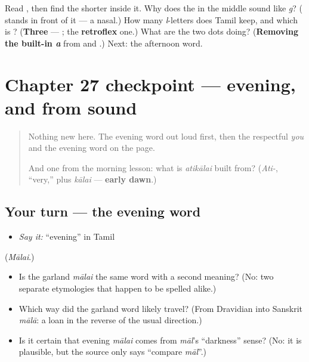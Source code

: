\begin{tcolorbox}[breakable,colback=teal!4,colframe=teal!35!black,title={Before you move on}]
Read \textbf{}, then find the shorter \textbf{} inside it. Why does the \textbf{} in the middle sound like \emph{g}? (\textbf{} stands in front of it — a nasal.) How many \emph{l}-letters does Tamil keep, and which is \textbf{}? (\textbf{Three} —   ; the \textbf{retroflex} one.) What are the two dots doing? (\textbf{Removing the built-in \emph{a}} from  and .) Next: the afternoon word.
\end{tcolorbox}
\section[Practice]{Chapter 27 checkpoint — evening, and  from sound}

\label{lesson:TA-C27-checkpoint}



\begin{quote}
Nothing new here. The evening word out loud first, then the respectful \emph{you} and the evening word on the page.

And one from the morning lesson: what is \emph{atikālai} built from? (\emph{Ati-}, \textquotedblleft{}very,\textquotedblright{} plus \emph{kālai} — \textbf{early dawn}.)
\end{quote}

\subsection*{Your turn — the evening word}
\begin{itemize}
\raggedright
  \item \emph{Say it:} \textquotedblleft{}evening\textquotedblright{} in Tamil
\end{itemize}

(\emph{Mālai}.)

\begin{itemize}
\raggedright
  \item Is the garland \emph{mālai} the same word with a second meaning? (No: two separate etymologies that happen to be spelled alike.)
  \item Which way did the garland word likely travel? (From Dravidian into Sanskrit \emph{mālā}: a loan in the reverse of the usual direction.)
  \item Is it certain that evening \emph{mālai} comes from \emph{māl}'s \textquotedblleft{}darkness\textquotedblright{} sense? (No: it is plausible, but the source only says \textquotedblleft{}compare \emph{māl}\textquotedblright{}.)
\end{itemize}

